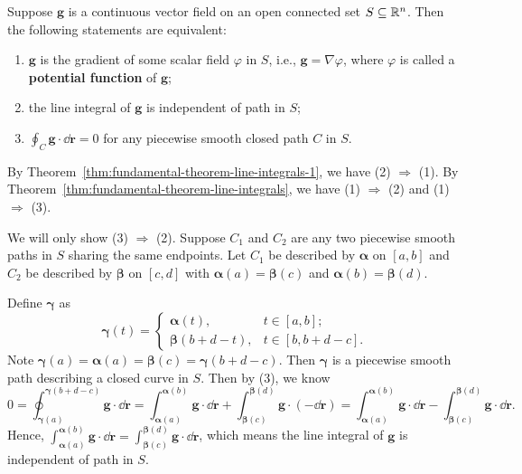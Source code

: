     \begin{theoremenv}
        Suppose $\bm g$ is a continuous vector field on an open connected set $S \subseteq \mathbb{R}^n$. Then the following statements are equivalent:
        \begin{enumerate}[label=(\arabic*)]
            \item $\bm g$ is the gradient of some scalar field $\varphi$ in $S$, i.e., $\bm g = \nabla \varphi$, where $\varphi$ is called a \textbf{potential function} of $\bm g$;
            \item the line integral of $\bm g$ is independent of path in $S$;
            \item $\displaystyle \oint_C \bm g \cdot \dd \bm r = 0$ for any piecewise smooth closed path $C$ in $S$.
        \end{enumerate}
    \end{theoremenv}
    \begin{proofenv}
        By Theorem~\ref{thm:fundamental-theorem-line-integrals-1}, we have (2) $\Rightarrow$ (1). By Theorem~\ref{thm:fundamental-theorem-line-integrals}, we have (1) $\Rightarrow$ (2) and (1) $\Rightarrow$ (3). 
        
        We will only show (3) $\Rightarrow$ (2). Suppose $C_1$ and $C_2$ are any two piecewise smooth paths in $S$ sharing the same endpoints. Let $C_1$ be described by $\bm \alpha$ on $[a,b]$ and $C_2$ be described by $\bm \beta$ on $[c,d]$ with $\bm \alpha(a) = \bm \beta(c)$ and $\bm \alpha(b) = \bm \beta(d)$.

        Define $\bm \gamma$ as
        $$ \bm \gamma(t) = \begin{cases}
            \bm \alpha(t), & t\in [a,b]; \\
            \bm \beta(b + d - t), & t\in [b, b + d - c].
        \end{cases} $$
        Note $\bm \gamma(a) = \bm \alpha(a) = \bm \beta(c) = \bm \gamma(b + d - c)$. Then $\bm \gamma$ is a piecewise smooth path describing a closed curve in $S$. Then by (3), we know 
        $$ 0 = \oint_{\bm \gamma(a)}^{\bm \gamma(b + d - c)} \bm g \cdot \dd \bm r = \int_{\bm \alpha(a)}^{\bm \alpha(b)} \bm g \cdot \dd \bm r + \int_{\bm \beta(c)}^{\bm \beta(d)} \bm g \cdot (-\dd \bm r) = \int_{\bm \alpha(a)}^{\bm \alpha(b)} \bm g \cdot \dd \bm r - \int_{\bm \beta(c)}^{\bm \beta(d)} \bm g \cdot  \dd \bm r. $$
        Hence, $\displaystyle \int_{\bm \alpha(a)}^{\bm \alpha(b)} \bm g \cdot \dd \bm r = \int_{\bm \beta(c)}^{\bm \beta(d)} \bm g \cdot  \dd \bm r$, which means the line integral of $\bm g$ is independent of path in $S$.
    \end{proofenv}
